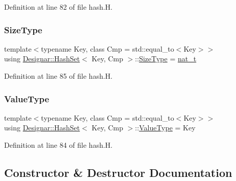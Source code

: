 Definition at line 82 of file hash.\+H.

\mbox{\label{class_designar_1_1_hash_set_a1bfcb16c2a94c0ab22e15f38b05ba8cc}} 
\subsubsection{\texorpdfstring{Size\+Type}{SizeType}}
{\footnotesize\ttfamily template$<$typename Key, class Cmp = std\+::equal\+\_\+to$<$\+Key$>$$>$ \\
using \hyperlink{class_designar_1_1_hash_set}{Designar\+::\+Hash\+Set}$<$ Key, Cmp $>$\+::\hyperlink{class_designar_1_1_hash_set_a1bfcb16c2a94c0ab22e15f38b05ba8cc}{Size\+Type} =  \hyperlink{namespace_designar_aa72662848b9f4815e7bf31a7cf3e33d1}{nat\+\_\+t}}



Definition at line 85 of file hash.\+H.

\mbox{\label{class_designar_1_1_hash_set_a4edc6d161470bffb03dad2bbc916b6a0}} 
\subsubsection{\texorpdfstring{Value\+Type}{ValueType}}
{\footnotesize\ttfamily template$<$typename Key, class Cmp = std\+::equal\+\_\+to$<$\+Key$>$$>$ \\
using \hyperlink{class_designar_1_1_hash_set}{Designar\+::\+Hash\+Set}$<$ Key, Cmp $>$\+::\hyperlink{class_designar_1_1_hash_set_a4edc6d161470bffb03dad2bbc916b6a0}{Value\+Type} =  Key}



Definition at line 84 of file hash.\+H.



\subsection{Constructor \& Destructor Documentation}
\mbox{\label{class_designar_1_1_hash_set_afb5e932ee4dcc9b1dec4d6eefd810c32}} 
